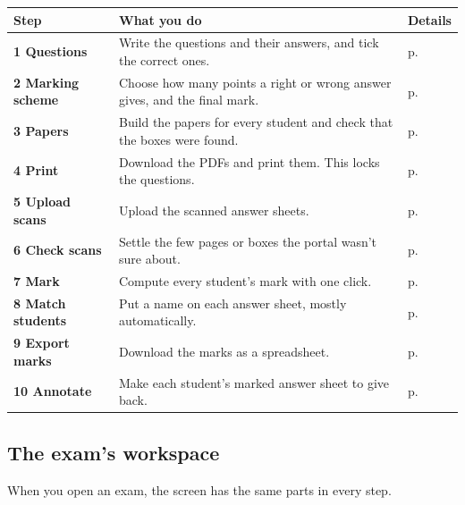 \documentclass[11pt]{article}
\begin{document}
\begin{panel}
\renewcommand{\arraystretch}{1.3}\small
\begin{tabularx}{\linewidth}{@{}>{\bfseries}l X >{\raggedleft\arraybackslash}p{17mm}@{}}
\toprule
Step & What you do & Details\\
\midrule
\textcolor{before}{1 Questions} & Write the questions and their answers, and tick the correct ones. & p.~\pageref{step:questions}\\
\textcolor{before}{2 Marking scheme} & Choose how many points a right or wrong answer gives, and the final mark. & p.~\pageref{step:marking}\\
\textcolor{before}{3 Papers} & Build the papers for every student and check that the boxes were found. & p.~\pageref{step:papers}\\
\textcolor{before}{4 Print} & Download the PDFs and print them. This locks the questions. & p.~\pageref{step:print}\\
\midrule
\textcolor{after}{5 Upload scans} & Upload the scanned answer sheets. & p.~\pageref{step:upload}\\
\textcolor{after}{6 Check scans} & Settle the few pages or boxes the portal wasn't sure about. & p.~\pageref{step:check}\\
\textcolor{after}{7 Mark} & Compute every student's mark with one click. & p.~\pageref{step:mark}\\
\textcolor{after}{8 Match students} & Put a name on each answer sheet, mostly automatically. & p.~\pageref{step:match}\\
\textcolor{after}{9 Export marks} & Download the marks as a spreadsheet. & p.~\pageref{step:export}\\
\textcolor{after}{10 Annotate} & Make each student's marked answer sheet to give back. & p.~\pageref{step:annotate}\\
\bottomrule
\end{tabularx}
\end{panel}

\subsection{The exam's workspace}\label{sec:workspace}

When you open an exam, the screen has the same parts in every step.
\end{document}
